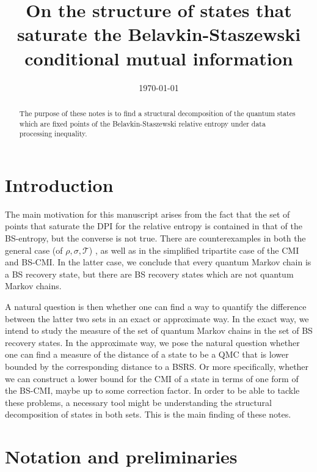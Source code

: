 \documentclass[11pt]{article}
\theoremstyle{newdefinition}
\theoremstyle{newplain}
\theoremstyle{myplain}
\DeclareMathOperator{\1}{\mathds{1}}
\begin{document}
\title{On the structure of states that saturate the Belavkin-Staszewski conditional mutual information}

\author{}

\date{\today}


\maketitle

\begin{abstract}
    The purpose of these notes is to find a structural decomposition of the quantum states which are fixed points of the Belavkin-Staszewski relative entropy under data processing inequality.
\end{abstract}


\section{Introduction}



The main motivation for this manuscript arises from the fact that the set of points that saturate the DPI for the relative entropy is contained in that of the BS-entropy, but the converse is not true. There are counterexamples in both the general case (of $\rho, \sigma, \mathcal{T}$) \cite{HiaiMosonyi-f-divergences-2017,Jencova2009}, as well as in the simplified tripartite case of the CMI and BS-CMI. In the latter case, we conclude that every quantum Markov chain is a BS recovery state, but there are BS recovery states which are not quantum Markov chains. 

A natural question is then whether one can find a way to quantify the difference between the latter two sets in an exact or approximate way. In the exact way, we intend to study the measure of the set of quantum Markov chains in the set of BS recovery states. In the approximate way, we pose the natural question whether one can find a measure of the distance of a state to be a QMC that is lower bounded by the corresponding distance to a BSRS. Or more specifically, whether we can construct a lower bound for the CMI of a state in terms of one form of the BS-CMI, maybe up to some correction factor. In order to be able to tackle these problems, a necessary tool might be understanding the structural decomposition of states in both sets. This is the main finding of these notes.



\section{Notation and preliminaries}
\end{document}

